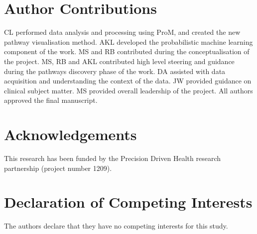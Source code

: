 \documentclass{elsarticle}
\begin{document}
\linenumbers



\section*{Author Contributions}
CL performed data analysis and processing using ProM, and created the new pathway visualisation method.
AKL developed the probabilistic machine learning component of the work.
MS and RB contributed during the conceptualisation of the project. MS, RB and AKL contributed  high level steering and guidance during the pathways discovery phase of the work.
DA assisted with data acquisition and understanding the context of the data.
JW provided guidance on clinical subject matter.
MS provided overall leadership of the project.
All authors approved the final manuscript.

\section*{Acknowledgements}
This research has been funded by the Precision Driven Health research partnership (project number 1209).

\section*{Declaration of Competing Interests}
The authors declare that they have no competing interests for this study.



\begin{appendix}

\end{appendix}
\end{document}
